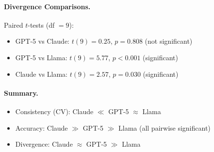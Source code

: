 \documentclass{article}
\begin{document}
\paragraph{Divergence Comparisons.} Paired $t$-tests (df $= 9$):
\begin{itemize}
    \item GPT-5 vs Claude: $t(9) = 0.25$, $p = 0.808$ (not significant)
    \item GPT-5 vs Llama: $t(9) = 5.77$, $p < 0.001$ (significant)
    \item Claude vs Llama: $t(9) = 2.57$, $p = 0.030$ (significant)
\end{itemize}

\paragraph{Summary.} 
\begin{itemize}
    \item Consistency (CV): Claude $\ll$ GPT-5 $\approx$ Llama
    \item Accuracy: Claude $\gg$ GPT-5 $\gg$ Llama (all pairwise significant)
    \item Divergence: Claude $\approx$ GPT-5 $\gg$ Llama
\end{itemize}
\end{document}
